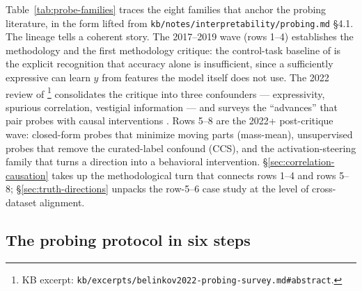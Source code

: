 Table~\ref{tab:probe-families} traces the eight families that anchor the
 probing literature, in the form lifted from
\texttt{kb/notes/interpretability/probing.md} \S 4.1. The lineage tells
a coherent story. The 2017--2019 wave (rows 1--4) establishes the
methodology and the first methodology critique: the control-task
baseline of \citet{hewitt2019-control-tasks} is the explicit recognition
that  accuracy alone is insufficient, since a sufficiently
expressive  can learn $y$ from features the model itself does not
use. The 2022 review of \citet{belinkov2022-probing-survey}\footnote{KB
excerpt: \texttt{kb/excerpts/belinkov2022-probing-survey.md\#abstract}.}
consolidates the critique into three confounders —  expressivity,
spurious correlation, vestigial information — and surveys the
``advances'' that pair probes with causal interventions
\citep[\S abstract; advances]{belinkov2022-probing-survey}. Rows 5--8 are
the 2022+ post-critique wave: closed-form probes that minimize moving
parts (mass-mean), unsupervised probes that remove the curated-label
confound (CCS), and the activation-steering family that turns a 
direction into a behavioral intervention. \S\ref{sec:correlation-causation}
takes up the methodological turn that connects rows 1--4 and rows 5--8;
\S\ref{sec:truth-directions} unpacks the row-5--6 case study at the level
of cross-dataset alignment.

\subsection{The probing protocol in six steps}
\label{sec:probe-protocol}

